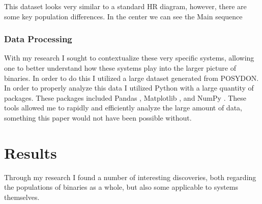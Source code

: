 \documentclass[12pt, a4paper]{article}
\begin{document}
        This dataset looks very similar to a standard HR diagram, however, there are some key population differences. In the center we can see the Main sequence
        \subsubsection{Data Processing}
            With my research I sought to contextualize these very specific systems, allowing one to better understand how these systems play into the larger picture of binaries. In order to do this I utilized a large dataset generated from POSYDON. In order to properly analyze this data I utilized Python with a large quantity of packages. These packages included Pandas \parencite{reback2020pandas}, Matplotlib \parencite{Matplotlib}, and NumPy \parencite{harris2020array}. These tools allowed me to rapidly and efficiently analyze the large amount of data, something this paper would not have been possible without.


    \section{Results}
        Through my research I found a number of interesting discoveries, both regarding the populations of binaries as a whole, but also some applicable to systems themselves.



\end{document}
